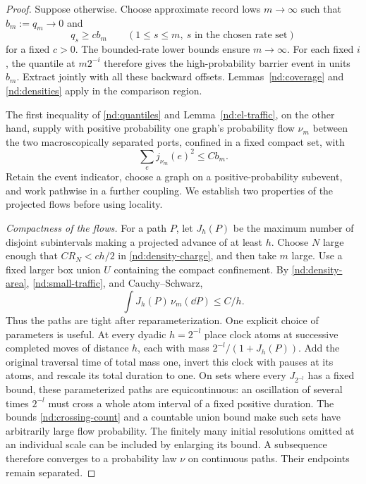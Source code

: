 \begin{proof}
Suppose otherwise.  Choose approximate record lows $m\to\infty$
such that $b_m:=q_m\to0$ and
\[
 q_s\ge c b_m\qquad(1\le s\le m,\ s\text{ in the chosen rate set})
\]
for a fixed $c>0$.  The bounded-rate lower bounds ensure $m\to\infty$.
For each fixed $i$, the quantile at $m2^{-i}$ therefore gives the
high-probability barrier event in units $b_m$.  Extract jointly
with all these backward offsets.  Lemmas~\ref{nd:coverage} and
\ref{nd:densities} apply in the comparison region.

The first inequality of \eqref{nd:quantiles} and
Lemma~\ref{nd:el-traffic}, on the other hand, supply with positive
probability one graph's probability flow $\nu_m$ between the two
macroscopically separated ports, confined in a fixed compact set,
with
\begin{equation}\label{nd:small-traffic}
                      \sum_e j_{\nu_m}(e)^2\le Cb_m.
\end{equation}
Retain the event indicator, choose a graph on a positive-probability
subevent, and work pathwise in a further coupling.  We establish
two properties of the projected flows before using locality.

\emph{Compactness of the flows.}
For a path $P$, let $J_h(P)$ be the maximum number of disjoint
subintervals making a projected advance of at least $h$.  Choose
$N$ large enough that $CR_N<ch/2$ in
\eqref{nd:density-charge}, and then take $m$ large.  Use a fixed
larger box union $U$ containing the compact confinement.  By
\eqref{nd:density-area}, \eqref{nd:small-traffic}, and
Cauchy--Schwarz,
\begin{equation}\label{nd:crossing-count}
 \int J_h(P)\,\nu_m(\dd P)\le C/h.
\end{equation}
Thus the paths are tight after reparameterization.  One explicit
choice of parameters is useful.  At every dyadic $h=2^{-l}$ place
clock atoms at successive completed moves of distance $h$, each
with mass $2^{-l}/(1+J_h(P))$.  Add the original traversal time
of total mass one, invert this clock with pauses at its atoms,
and rescale its total duration to one.  On sets where every
$J_{2^{-l}}$ has a fixed bound, these parameterized paths are
equicontinuous: an oscillation of several times $2^{-l}$ must
cross a whole atom interval of a fixed positive duration.
The bounds \eqref{nd:crossing-count} and a countable union bound
make such sets have arbitrarily large flow probability.  The
finitely many initial resolutions omitted at an individual scale
can be included by enlarging its bound.  A subsequence therefore
converges to a probability law $\nu$ on continuous paths.  Their
endpoints remain separated.


\end{proof}
